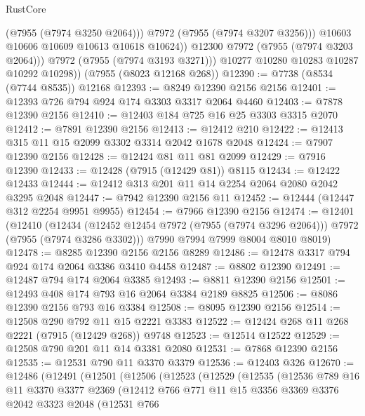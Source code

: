 \begin{lexlean}{RustCore}
\begin{coremodule}
                    (@7955 (@7974 @3250 @2064)))
                  @7972
                  (@7955 (@7974 @3207 @3256)))
                @10603
                @10606
                @10609
                @10613
                @10618
                @10624))
            @12300
            @7972
            (@7955 (@7974 @3203 @2064)))
          @7972
          (@7955 (@7974 @3193 @3271)))
        @10277
        @10280
        @10283
        @10287
        @10292
        @10298))
    (@7955 (@8023 @12168 @268))
@12390 := @7738 (@8534 (@7744 @8535)) @12168
@12393 := @8249 @12390 @2156 @2156
@12401 := @12393 @726 @794 @924 @174 @3303 @3317 @2064 @4460
@12403 := @7878 @12390 @2156
@12410 := @12403 @184 @725 @16 @25 @3303 @3315 @2070
@12412 := @7891 @12390 @2156
@12413 := @12412 @210
@12422 := @12413 @315 @11 @15 @2099 @3302 @3314 @2042 @1678 @2048
@12424 := @7907 @12390 @2156
@12428 := @12424 @81 @11 @81 @2099
@12429 := @7916 @12390
@12433 := @12428 (@7915 (@12429 @81)) @8115
@12434 := @12422 @12433
@12444 := @12412 @313 @201 @11 @14 @2254 @2064 @2080 @2042 @3295 @2048
@12447 := @7942 @12390 @2156 @11
@12452 := @12444 (@12447 @312 @2254 @9951 @9955)
@12454 := @7966 @12390 @2156
@12474 := @12401
    (@12410
      (@12434 (@12452 @12454 @7972 (@7955 (@7974 @3296 @2064))) @7972 (@7955 (@7974 @3286 @3302)))
      @7990
      @7994
      @7999
      @8004
      @8010
      @8019)
@12478 := @8285 @12390 @2156 @2156 @8289
@12486 := @12478 @3317 @794 @924 @174 @2064 @3386 @3410 @4458
@12487 := @8802 @12390
@12491 := @12487 @794 @174 @2064 @3385
@12493 := @8811 @12390 @2156
@12501 := @12493 @408 @174 @793 @16 @2064 @3384 @2189 @8825
@12506 := @8086 @12390 @2156 @793 @16 @3384
@12508 := @8095 @12390 @2156
@12514 := @12508 @290 @792 @11 @15 @2221 @3383
@12522 := @12424 @268 @11 @268 @2221 (@7915 (@12429 @268)) @9748
@12523 := @12514 @12522
@12529 := @12508 @790 @201 @11 @14 @3381 @2080
@12531 := @7868 @12390 @2156
@12535 := @12531 @790 @11 @3370 @3379
@12536 := @12403 @326
@12670 := @12486
    (@12491
      (@12501
        (@12506
          (@12523
            (@12529
              (@12535
                (@12536
                  @789
                  @16
                  @11
                  @3370
                  @3377
                  @2369
                  (@12412
                    @766
                    @771
                    @11
                    @15
                    @3356
                    @3369
                    @3376
                    @2042
                    @3323
                    @2048
                    (@12531
                      @766

\end{coremodule}
\end{lexlean}
